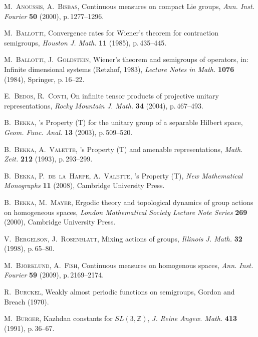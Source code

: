 \documentclass[11pt,english,a4paper]{smfart}
\numberwithin{equation}{section}
\theoremstyle{definition}
\begin{document}
 
\begin{thebibliography}{99999}
{

 \textsc{M.~Anoussis, A.~Bisbas,}
\newblock
Continuous measures on compact Lie groups,
\newblock \emph{Ann. Inst. Fourier} {\bf 50} (2000), p.\,1277--1296. 

 \textsc{M.~Ballotti,}
\newblock
 Convergence rates for Wiener's theorem for contraction semigroups,
\newblock \emph{Houston J. Math.} {\bf 11} (1985), p.\,435--445. 

 \textsc{M.~Ballotti, J.~Goldstein,}
\newblock
 Wiener's theorem and semigroups of operators, in:
\newblock Infinite dimensional systems (Retzhof, 1983), 
\emph{Lecture Notes in Math.} {\bf 1076} (1984), Springer, p.\,16--22.

 \textsc{E.~Bedos, R.~Conti,}
\newblock On infinite tensor products of projective unitary 
representations,
\newblock \emph{Rocky Mountain J. Math.} {\bf 34} (2004), p.\,467--493.

 \textsc{B.~Bekka,}
's Property (T) for the unitary group of a separable Hilbert 
space, 
\newblock \emph{Geom. Func. Anal.} {\bf 13} (2003), p.\,509--520.

 \textsc{B.~Bekka, A.~Valette,}
's Property (T) and amenable representations, 
\newblock \emph{Math. Zeit.} {\bf 212} (1993), p.\,293--299.

  \textsc{B.~Bekka, P.~de~la~Harpe, A.~Valette,}
's Property (T),
\newblock \emph{New Mathematical Monographs} {\bf 11} (2008), Cambridge 
University Press.

\textsc{B.~Bekka, M.~Mayer,}
\newblock Ergodic theory and topological dynamics of group actions on homogeneous spaces,
\newblock \emph{London Mathematical Society Lecture Note Series} \textbf{269} (2000), Cambridge University Press.

 \textsc{V.~Bergelson, J.~Rosenblatt,} 
\newblock Mixing actions of groups,
\newblock \emph{Illinois J. Math.} {\bf 32} (1998), p.\,65--80.

 \textsc{M.~Bj\"orklund, A.~Fish,}
\newblock Continuous measures on homogenous spaces,
\newblock \emph{Ann. Inst. Fourier} {\bf 59} (2009), p.\,2169--2174.  

 \textsc{R.~Burckel,}
\newblock Weakly almost periodic functions on semigroups, Gordon and 
Breach (1970).

 \textsc{M.~Burger,} 
\newblock Kazhdan constants for $SL(3,{\ensuremath{\mathbb Z}})$, 
\newblock \emph{J. Reine Angew. Math.} {\bf 413} (1991), p.\,36--67.

}
\end{thebibliography}
\end{document}
